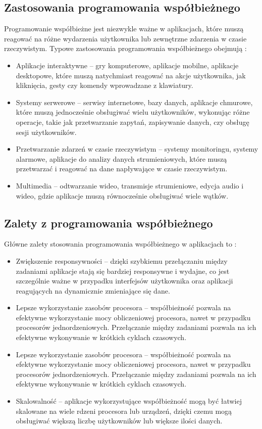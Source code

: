 \subsection{Zastosowania programowania współbieżnego}
Programowanie współbieżne jest niezwykle ważne w aplikacjach, które muszą reagować na różne wydarzenia użytkownika lub zewnętrzne zdarzenia w czasie rzeczywistym. Typowe zastosowania programowania współbieżnego obejmują \cite{ZastosowanieWspolbieznosci, ConcurrencyInAction}:
\begin{itemize}
    \item Aplikacje interaktywne – gry komputerowe, aplikacje mobilne, aplikacje desktopowe, które muszą natychmiast reagować na akcje użytkownika, jak kliknięcia, gesty czy komendy wprowadzane z klawiatury.
    \item Systemy serwerowe – serwisy internetowe, bazy danych, aplikacje chmurowe, które muszą jednocześnie obsługiwać wielu użytkowników, wykonując różne operacje, takie jak przetwarzanie zapytań, zapisywanie danych, czy obsługę sesji użytkowników.
    \item Przetwarzanie zdarzeń w czasie rzeczywistym – systemy monitoringu, systemy alarmowe, aplikacje do analizy danych strumieniowych, które muszą przetwarzać i reagować na dane napływające w czasie rzeczywistym.
    \item Multimedia – odtwarzanie wideo, transmisje strumieniowe, edycja audio i wideo, gdzie aplikacje muszą równocześnie obsługiwać wiele wątków.
\end{itemize}


\subsection{Zalety z programowania współbieżnego}
Główne zalety stosowania programowania współbieżnego w aplikacjach to \cite{ProsAndCons, ConcurrencyInAction}:
\begin{itemize}
    \item Zwiększenie responsywności – dzięki szybkiemu przełączaniu między zadaniami aplikacje stają się bardziej responsywne i wydajne, co jest szczególnie ważne w przypadku interfejsów użytkownika oraz aplikacji reagujących na dynamicznie zmieniające się dane.
    \item Lepsze wykorzystanie zasobów procesora – współbieżność pozwala na efektywne wykorzystanie mocy obliczeniowej procesora, nawet w przypadku procesorów jednordzeniowych. Przełączanie między zadaniami pozwala na ich efektywne wykonywanie w krótkich cyklach czasowych.
    \item Lepsze wykorzystanie zasobów procesora – współbieżność pozwala na efektywne wykorzystanie mocy obliczeniowej procesora, nawet w przypadku procesorów jednordzeniowych. Przełączanie między zadaniami pozwala na ich efektywne wykonywanie w krótkich cyklach czasowych.
    \item Skalowalność – aplikacje wykorzystujące współbieżność mogą być łatwiej skalowane na wiele rdzeni procesora lub urządzeń, dzięki czemu mogą obsługiwać większą liczbę użytkowników lub większe ilości danych.
\end{itemize}

